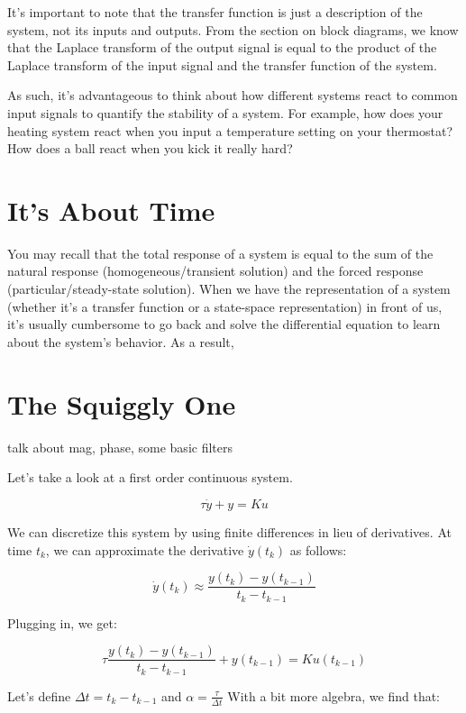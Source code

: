 \documentclass{report}
\begin{document}
\begin{onehalfspacing}
\begin{flushleft}
It's important to note that the transfer function is just a description of the system, not its inputs and outputs. From the section on block diagrams, we know that the Laplace transform of the output signal is equal to the product of the Laplace transform of the input signal and the transfer function of the system.

\medskip

As such, it's advantageous to think about how different systems react to common input signals to quantify the stability of a system. For example, how does your heating system react when you input a temperature setting on your thermostat? How does a ball react when you kick it really hard?

\section{It's About Time}

You may recall that the total response of a system is equal to the sum of the natural response (homogeneous/transient solution) and the forced response (particular/steady-state solution). When we have the representation of a system (whether it's a transfer function or a state-space representation) in front of us, it's usually cumbersome to go back and solve the differential equation to learn about the system's behavior. As a result, 

\section{The Squiggly One}

talk about mag, phase, some basic filters

Let's take a look at a first order continuous system.

\vspace{-0.1in}
\[\tau \dot{y} + y = Ku\]

We can discretize this system by using finite differences in lieu of derivatives. At time \(t_k\), we can approximate the derivative \(\dot{y}(t_k)\) as follows:

\vspace{-0.1in}
\[\dot{y}(t_k) \approx \frac{y(t_k) - y(t_{k-1})}{t_k - t_{k-1}}\]

Plugging in, we get:

\vspace{-0.1in}
\[\tau \frac{y(t_k) - y(t_{k-1})}{t_k - t_{k-1}} + y(t_{k-1}) = Ku(t_{k-1})\]

Let's define \(\Delta t = t_k - t_{k-1}\) and \(\alpha = \frac{\tau}{\Delta t}\) With a bit more algebra, we find that:


\end{flushleft}
\end{onehalfspacing}
\end{document}
